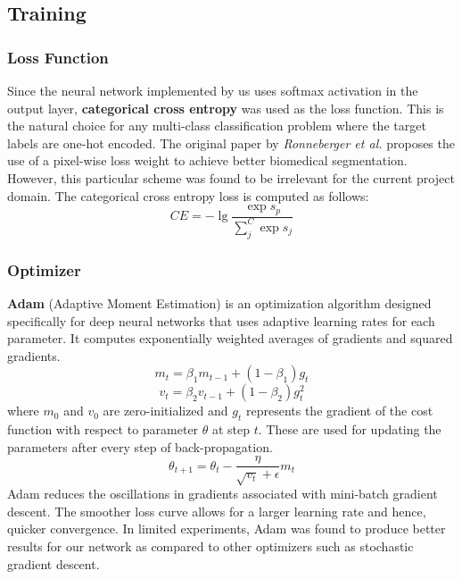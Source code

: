 \documentclass[12pt, a4paper]{report}
\begin{document}
\subsection{Training}
\subsubsection{Loss Function}
Since the neural network implemented by us uses softmax activation in the output layer, \textbf{categorical cross entropy} was used as the loss function. This is the natural choice for any multi-class classification problem where the target labels are one-hot encoded.\cite{crossentr} The original paper by \textit{Ronneberger et al.}\cite{unet} proposes the use of a pixel-wise loss weight to achieve better biomedical segmentation. However, this particular scheme was found to be irrelevant for the current project domain. The categorical cross entropy loss is computed as follows:
\begin{displaymath}
CE=-\lg{\frac{\exp{s_p}}{\sum_{j}^{C}\exp{s_j}}}
\end{displaymath}
\subsubsection{Optimizer}
\textbf{Adam} (Adaptive Moment Estimation) is an optimization algorithm designed specifically for deep neural networks that uses adaptive learning rates for each parameter.\cite{adam_web} It computes exponentially weighted averages of gradients and squared gradients. 
\begin{displaymath}
m_t=\beta_1m_{t-1}+(1-\beta_1)g_t
\end{displaymath}
\begin{displaymath}
v_t=\beta_2v_{t-1}+(1-\beta_2)g_t^2
\end{displaymath}
where $m_0$ and $v_0$ are zero-initialized and $g_t$ represents the gradient of the cost function with respect to parameter $\theta$ at step $t$.
These are used for updating the parameters after every step of back-propagation.
\begin{displaymath}
\theta_{t+1}=\theta_{t}-\frac{\eta}{\sqrt{v_t}+\epsilon}m_t
\end{displaymath}
Adam reduces the oscillations in gradients associated with mini-batch gradient descent. The smoother loss curve allows for a larger learning rate and hence, quicker convergence. In limited experiments, Adam was found to produce better results for our network as compared to other optimizers such as stochastic gradient descent.
\end{document}
